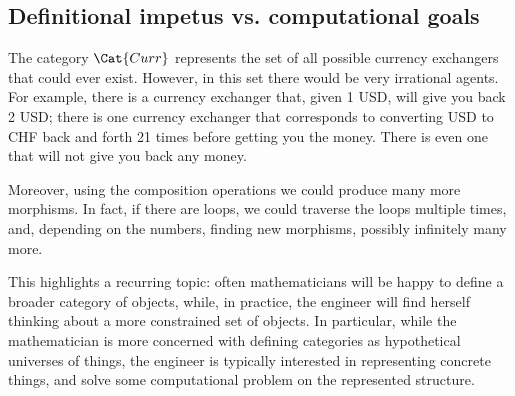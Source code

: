 


\subsection{Definitional impetus   vs. computational goals  }

The category $\Cat{Curr}$ represents the set of all possible currency exchangers that could
ever exist. However, in this set there would be very irrational agents. For example, there is a currency exchanger that, given 1 USD, will give you back 2 USD; there is one currency exchanger that 
corresponds to converting USD to CHF back and forth 21 times before getting you the money. There is even one that will not give you back any money. 

Moreover, using the composition operations we could produce many more morphisms. In fact, if there are loops, we could traverse the loops multiple times, and, depending on the numbers, finding new morphisms, possibly infinitely many more.

This highlights a recurring topic: often mathematicians will be happy to define a broader category of objects, while, in practice, the engineer will find herself thinking about a more constrained set of objects. 
In particular, while the mathematician is more concerned with defining categories as hypothetical universes of things, the engineer is typically interested in representing concrete things, and solve some computational problem on the represented structure. 

